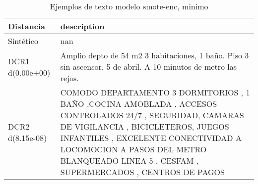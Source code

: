 \begin{table}[H]
\centering
\fontsize{10}{14}\selectfont
\caption{Ejemplos de texto modelo smote-enc, minimo}
\label{table-example-economicos-a-1-smote-enc-min-text}
\begin{tabular}{|l|m{35em}|}
\hline
\rowcolor[gray]{0.8}
Distancia & description \\
\hline Sintético & nan \\
\hline DCR1 d(0.00e+00) & Amplio depto de 54 m2 3 habitaciones, 1 ba\~no. Piso 3 sin ascensor.   5 de abril. A 10 minutos de metro las rejas. \\
\hline DCR2 d(8.15e-08) & COMODO DEPARTAMENTO 3 DORMITORIOS , 1 BA\~NO ,COCINA AMOBLADA , ACCESOS CONTROLADOS 24/7 , SEGURIDAD, CAMARAS DE VIGILANCIA , BICICLETEROS, JUEGOS INFANTILES , EXCELENTE CONECTIVIDAD A LOCOMOCION A PASOS DEL METRO BLANQUEADO LINEA 5 , CESFAM , SUPERMERCADOS , CENTROS DE PAGOS \\
\hline
\end{tabular}
\end{table}
